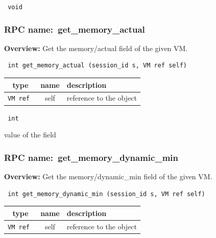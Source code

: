 \vspace{0.3cm}

{\tt 
void
}



\vspace{0.3cm}
\vspace{0.3cm}
\vspace{0.3cm}
\subsubsection{RPC name:~get\_memory\_actual}

{\bf Overview:} 
Get the memory/actual field of the given VM.

\begin{verbatim} int get_memory_actual (session_id s, VM ref self)\end{verbatim}



 
\vspace{0.3cm}
\begin{tabular}{|c|c|p{7cm}|}
 \hline
{\bf type} & {\bf name} & {\bf description} \\ \hline
{\tt VM ref } & self & reference to the object \\ \hline 

\end{tabular}

\vspace{0.3cm}

{\tt 
int
}


value of the field
\vspace{0.3cm}
\vspace{0.3cm}
\vspace{0.3cm}
\subsubsection{RPC name:~get\_memory\_dynamic\_min}

{\bf Overview:} 
Get the memory/dynamic\_min field of the given VM.

\begin{verbatim} int get_memory_dynamic_min (session_id s, VM ref self)\end{verbatim}



 
\vspace{0.3cm}
\begin{tabular}{|c|c|p{7cm}|}
 \hline
{\bf type} & {\bf name} & {\bf description} \\ \hline
{\tt VM ref } & self & reference to the object \\ \hline 

\end{tabular}

